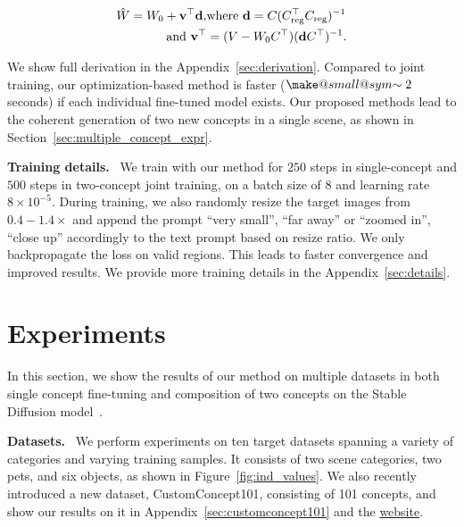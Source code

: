 \begin{equation}
    \begin{split}
     \hat{W} =  W_{0} + {\mathbf{v}}^\top {\mathbf{d}},
      & \textnormal{where } {\mathbf{d}} = C(C_{\textnormal{reg}}^\top C_{\textnormal{reg}})^{-1} \\
     \textnormal{and } {\mathbf{v}}^\top & = ( V -  W_{0}C^\top )( {\mathbf{d}} C^\top )^{-1}.
    \end{split}\label{eq:solution}
\end{equation}

We show full derivation in the Appendix~\ref{sec:derivation}. Compared to joint training, our optimization-based method is faster ($\mathrel{\mathpalette\make@small@sym{\sim}}2$ seconds) if each individual fine-tuned model exists. Our proposed methods lead to the coherent generation of two new concepts in a single scene, as shown in Section~\ref{sec:multiple_concept_expr}. 

  \textbf{Training details.} \ 
We train with our method for $250$ steps in single-concept and $500$ steps in two-concept joint training, on a batch size of $8$ and learning rate $8 \times 10^{-5}$. During training, we also randomly resize the target images from $0.4 - 1.4 \times$ and append the prompt ``very small'', ``far away'' or ``zoomed in'', ``close up'' accordingly to the text prompt based on resize ratio. We only backpropagate the loss on valid regions. This leads to faster convergence and improved results. We provide more training details in the Appendix~\ref{sec:details}.

\section{Experiments}\label{sec:expr}
In this section, we show the results of our method on multiple datasets in both single concept fine-tuning and composition of two concepts on the Stable Diffusion model~\cite{stablediffusionlink}. 

  \textbf{Datasets.} \  We perform experiments on ten target datasets spanning a variety of categories and varying training samples. It consists of two scene categories, two pets, and six objects, as shown in Figure~\ref{fig:ind_values}. We also recently introduced a new dataset, CustomConcept101, consisting of 101 concepts, and show our results on it in Appendix~\ref{sec:customconcept101} and the \href{https://www.cs.cmu.edu/~custom-diffusion/dataset.html} {website}.  

